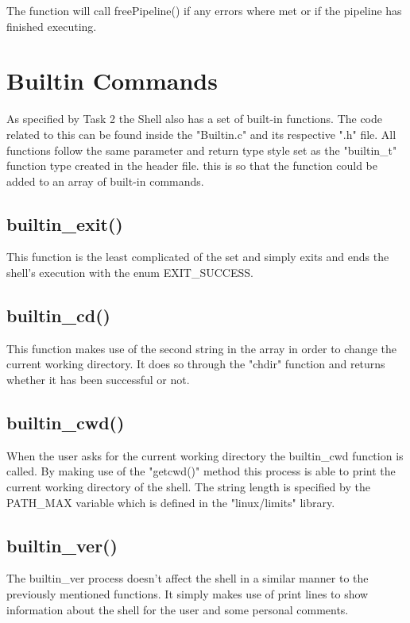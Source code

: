 \documentclass[12pt, a4paper]{report}
\begin{document}
The function will call freePipeline() if any errors where met or if the pipeline has finished executing.


\chapter{Builtin Commands}
As specified by Task 2 the Shell also has a set of built-in functions. The code related to this can be found inside the "Builtin.c" and its respective ".h" file. All functions follow the same parameter and return type style set as the "builtin\_t" function type created in the header file. this is so that the function could be added to an array of built-in commands.

\section{builtin\_exit()}
This function is the least complicated of the set and simply exits and ends the shell's execution with the enum EXIT\_SUCCESS.

\section{builtin\_cd()}
This function makes use of the second string in the array in order to change the current working directory. It does so through the "chdir" function and returns whether it has been successful or not.

\section{builtin\_cwd()}
When the user asks for the current working directory the builtin\_cwd function is called. By making use of the "getcwd()" method this process is able to print the current working directory of the shell. The string length is specified by the PATH\_MAX variable which is defined in the "linux/limits" library.

\section{builtin\_ver()}
The builtin\_ver process doesn't affect the shell in a similar manner to the previously mentioned functions. It simply makes use of print lines to show information about the shell for the user and some personal comments.
\end{document}
